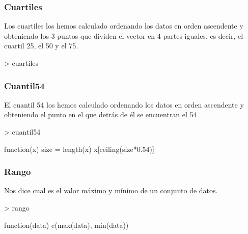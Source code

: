 \documentclass [a4paper] {article}
\begin{document}
\subsubsection{Cuartiles}
Los cuartiles los hemos calculado ordenando los datos en orden ascendente 
y obteniendo los 3 puntos que dividen el vector en 4 partes iguales, es decir, 
el cuartil 25, el 50 y el 75.
\begin{Schunk}
\begin{Sinput}
> cuartiles
\end{Sinput}
\end{Schunk}
\subsubsection{Cuantil54}
El cuantil 54 los hemos calculado ordenando los datos en orden ascendente 
y obteniendo el punto en el que detrás de él se encuentran el 54%
\begin{Schunk}
\begin{Sinput}
> cuantil54
\end{Sinput}
\begin{Soutput}
function(x){
  size = length(x)
  x[ceiling(size*0.54)]
}
\end{Soutput}
\end{Schunk}
\subsubsection{Rango}
Nos dice cual es el valor máximo y mínimo de un conjunto de datos.
\begin{Schunk}
\begin{Sinput}
> rango
\end{Sinput}
\begin{Soutput}
function(data){
  c(max(data), min(data))
}
\end{Soutput}
\end{Schunk}
\end{document}
